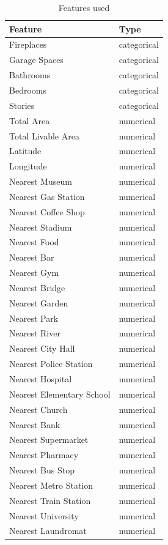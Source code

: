 \documentclass[11pt,a4paper]{article}
\begin{document}
\begin{table}[]
\centering
\begin{tabular}{|l|l|}
\hline
\textbf{Feature} & \textbf{Type} \\ \hline
Fireplaces       & categorical   \\ 
Garage Spaces             & categorical \\ 
Bathrooms                 & categorical \\ 
Bedrooms                  & categorical \\ 
Stories                   & categorical \\ 
Total Area                & numerical   \\ 
Total Livable Area        & numerical   \\ 
Latitude                  & numerical   \\ 
Longitude                 & numerical   \\ 
Nearest Museum            & numerical   \\ 
Nearest Gas Station       & numerical   \\ 
Nearest Coffee Shop       & numerical   \\ 
Nearest Stadium           & numerical   \\ 
Nearest Food              & numerical   \\ 
Nearest Bar               & numerical   \\ 
Nearest Gym               & numerical   \\ 
Nearest Bridge            & numerical   \\ 
Nearest Garden            & numerical   \\ 
Nearest Park              & numerical   \\ 
Nearest River             & numerical   \\ 
Nearest City Hall         & numerical   \\ 
Nearest Police Station    & numerical   \\ 
Nearest Hospital          & numerical   \\ 
Nearest Elementary School & numerical   \\ 
Nearest Church            & numerical   \\ 
Nearest Bank              & numerical   \\ 
Nearest Supermarket       & numerical   \\ 
Nearest Pharmacy          & numerical   \\ 
Nearest Bus Stop          & numerical   \\ 
Nearest Metro Station     & numerical   \\ 
Nearest Train Station     & numerical   \\ 
Nearest University        & numerical   \\ 
Nearest Laundromat        & numerical   \\ \hline
\end{tabular}
\caption{Features used}
\label{tab:features}
\end{table}
\end{document}
